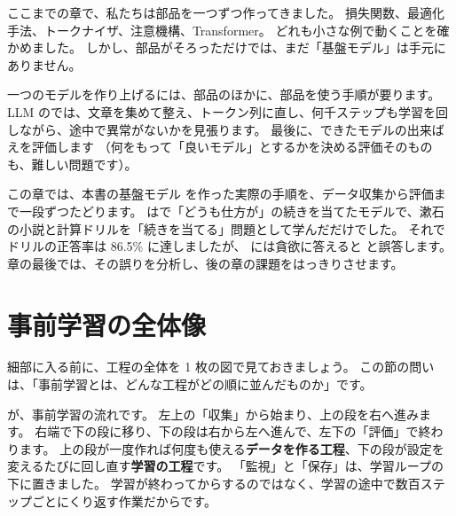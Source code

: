 ここまでの章で、私たちは部品を一つずつ作ってきました。
損失関数、最適化手法、トークナイザ、注意機構、Transformer。
どれも小さな例で動くことを確かめました。
しかし、部品がそろっただけでは、まだ「基盤モデル」は手元にありません。

一つのモデルを作り上げるには、部品のほかに、部品を使う手順が要ります。
LLM のでは、文章を集めて整え、トークン列に直し、何千ステップも学習を回しながら、途中で異常がないかを見張ります。
最後に、できたモデルの出来ばえを評価します
（何をもって「良いモデル」とするかを決める評価そのものも、難しい問題です）。

この章では、本書の基盤モデル  を作った実際の手順を、データ収集から評価まで一段ずつたどります。
 はで「どうも仕方が」の続きを当てたモデルで、漱石の小説と計算ドリルを「続きを当てる」問題として学んだだけでした。
それでドリルの正答率は 86.5\% に達しましたが、 には貪欲に答えると  と誤答します。
章の最後では、その誤りを分析し、後の章の課題をはっきりさせます。

\section{事前学習の全体像}\label{sec:pt-overview}

細部に入る前に、工程の全体を 1 枚の図で見ておきましょう。
この節の問いは、「事前学習とは、どんな工程がどの順に並んだものか」です。

が、事前学習の流れです。
左上の「収集」から始まり、上の段を右へ進みます。
右端で下の段に移り、下の段は右から左へ進んで、左下の「評価」で終わります。
上の段が一度作れば何度も使える\textbf{データを作る工程}、下の段が設定を変えるたびに回し直す\textbf{学習の工程}です。
「監視」と「保存」は、学習ループの下に置きました。
学習が終わってからするのではなく、学習の途中で数百ステップごとにくり返す作業だからです。

